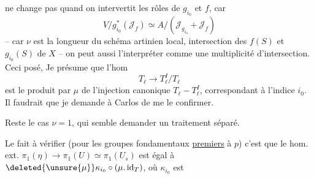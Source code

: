 ne change pas quand on intervertit les rôles de $g_{i_0}$ et $f$, car
\[
V/g_{i_0}^*(\mathcal J_f)\simeq A/(\mathcal J_{g_{i_0}}+\mathcal J_f)
\]
-- car $\nu$ est la longueur du schéma artinien local, intersection des  $f(S)$ et $g_{i_0}(S)$ de $X$ -- on peut aussi l'interpréter comme une multiplicité d'intersection. Ceci posé, Je présume que l'hom
\[
T_\ell\longrightarrow T_\ell^I/T_\ell
\]
est le produit par $\mu$ de l'injection canonique $T_\ell-T_\ell^I$, correspondant à l'indice $i_0$. Il faudrait que je demande à Carlos de me le confirmer.

Reste le cas $\nu=1$, qui semble demander un traitement séparé.

Le fait à vérifier (pour les groupes fondamentaux \uline{premiers} à $p$) c'est que le hom. ext. $\pi_1(\eta)\longrightarrow\pi_1(U)\simeq\pi_1(U_s)$ est égal à $\deleted{\unsure{\mu}}\kappa_{i_0}\circ(\mu.\operatorname{id}_T)$, où $\kappa_{i_0}$ est
